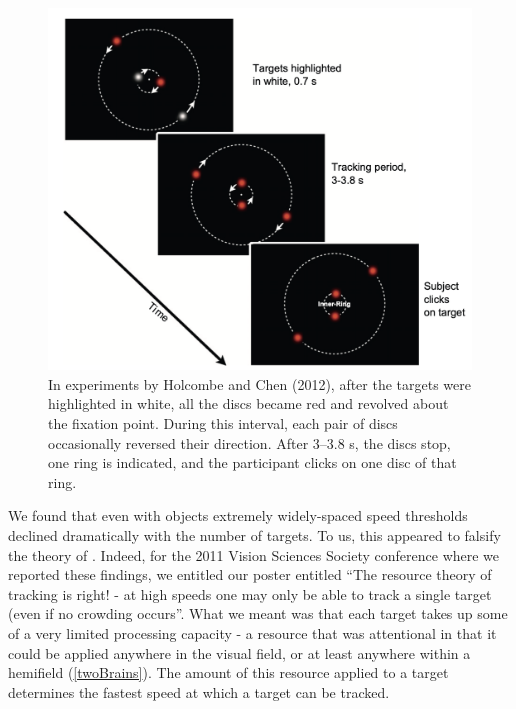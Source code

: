 \documentclass[
]{book}
\begin{document}
\begin{figure}
\includegraphics[width=1\linewidth]{imagesForRmd/HolcombeChen2012BasicTrial} \caption{In experiments by Holcombe and Chen (2012), after the targets were highlighted in white, all the discs became red and revolved about the fixation point. During this interval, each pair of discs occasionally reversed their direction. After 3–3.8 s, the discs stop, one ring is indicated, and the participant clicks on one disc of that ring.}\label{fig:HC2012BasicTrial}
\end{figure}

We found that even with objects extremely widely-spaced speed thresholds declined dramatically with the number of targets. To us, this appeared to falsify the theory of \citet{franconeriTrackingMultipleObjects2010a}. Indeed, for the 2011 Vision Sciences Society conference where we reported these findings, we entitled our poster entitled ``The resource theory of tracking is right! - at high speeds one may only be able to track a single target (even if no crowding occurs''. What we meant was that each target takes up some of a very limited processing capacity - a resource that was attentional in that it could be applied anywhere in the visual field, or at least anywhere within a hemifield (\ref{twoBrains}). The amount of this resource applied to a target determines the fastest speed at which a target can be tracked.
\end{document}
